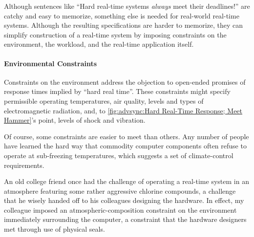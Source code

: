 Although sentences like ``Hard real-time systems \emph{always} meet
their deadlines!'' are catchy and easy to memorize, something else is
needed for real-world real-time systems.
Although the resulting specifications are
harder to memorize, they can simplify construction of a real-time
system by imposing constraints on the environment, the workload, and
the real-time application itself.

\paragraph{Environmental Constraints}
\label{sec:advsync:Environmental Constraints}

Constraints on the environment address the objection to open-ended
promises of response times implied by ``hard real time''.
These constraints might specify permissible operating temperatures,
air quality, levels and types of electromagnetic radiation, and, to
\cref{fig:advsync:Hard Real-Time Response; Meet Hammer}'s
point, levels of shock and vibration.

Of course, some constraints are easier to meet than others.
Any number of people have learned the hard way that
commodity computer components often refuse to operate at sub-freezing
temperatures, which suggests a set of climate-control requirements.

An old college friend once had the challenge of operating
a real-time system in an atmosphere featuring some rather aggressive
chlorine compounds, a challenge that he wisely handed off to his
colleagues designing the hardware.
In effect, my colleague imposed an atmospheric-composition constraint
on the environment immediately surrounding the computer, a constraint
that the hardware designers met through use of physical seals.

